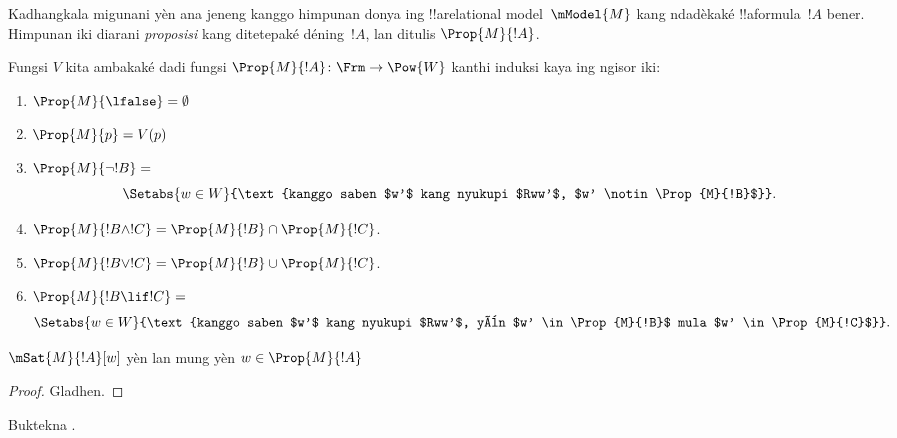 \documentclass[../../../include/open-logic-section]{subfiles}
\begin{document}


Kadhangkala migunani yèn ana jeneng kanggo himpunan donya
ing !!a{relational model}~$\mModel{M}$ kang ndadèkaké
!!a{formula}~$!A$ bener. Himpunan iki diarani
\emph{proposisi} kang ditetepaké déning~$!A$, lan ditulis
$\Prop{M}{!A}$.

\begin{defn}
  Fungsi $V$ kita ambakaké dadi fungsi $\Prop{M}{!A} \colon \Frm
  \to \Pow{W}$ kanthi induksi kaya ing ngisor iki:
  \begin{enumerate}
  \item $\Prop{M}{\lfalse} = \emptyset$
  \item $\Prop{M}{p} = V(p)$
  \item $\Prop{M}{\lnot !B} = {}$
    \[
      \Setabs{w \in W}{\text{kanggo saben $w'$ kang nyukupi $Rww'$, $w'
          \notin \Prop{M}{!B}$}}.
    \]
  \item $\Prop{M}{!B \land !C} = \Prop{M}{!B} \cap \Prop{M}{!C}$.
  \item $\Prop{M}{!B \lor !C} = \Prop{M}{!B} \cup \Prop{M}{!C}$.
  \item $\Prop{M}{!B \lif !C} = {}$
    \[
      \Setabs{w \in W}{\text{kanggo saben $w'$ kang nyukupi $Rww'$, yèn $w'
          \in \Prop{M}{!B}$ mula $w' \in \Prop{M}{!C}$}}.
    \]
  \end{enumerate}
\end{defn}

\begin{prop}
  $\mSat{M}{!A}[w]$ yèn lan mung yèn $w \in \Prop{M}{!A}$
\end{prop}

\begin{proof}
  Gladhen.
\end{proof}

\begin{prob}
  Buktekna .
\end{prob}
\end{document}
